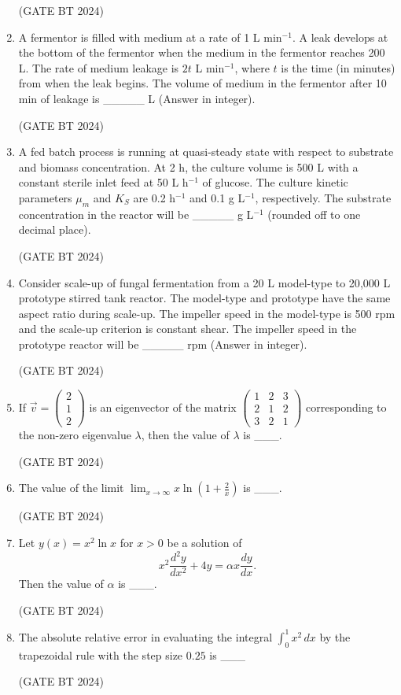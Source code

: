 \documentclass[journal,12pt,onecolumn]{IEEEtran}
\theoremstyle{remark}
\begin{document}
\begin{enumerate}
\hfill (GATE BT 2024)

\item A fermentor is filled with medium at a rate of 1 L min$^{-1}$. A leak develops at the bottom of the fermentor when the medium in the fermentor reaches 200 L. The rate of medium leakage is $2t$ L min$^{-1}$, where $t$ is the time (in minutes) from when the leak begins. The volume of medium in the fermentor after 10 min of leakage is \_\_\_\_\_ L (Answer in integer).

\hfill (GATE BT 2024)

\item A fed batch process is running at quasi-steady state with respect to substrate and biomass concentration. At 2 h, the culture volume is 500 L with a constant sterile inlet feed at 50 L h$^{-1}$ of glucose. The culture kinetic parameters $\mu_m$ and $K_S$ are 0.2 h$^{-1}$ and 0.1 g L$^{-1}$, respectively. The substrate concentration in the reactor will be \_\_\_\_\_ g L$^{-1}$ (rounded off to one decimal place).

\hfill (GATE BT 2024)

\item Consider scale-up of fungal fermentation from a 20 L model-type to 20{,}000 L prototype stirred tank reactor. The model-type and prototype have the same aspect ratio during scale-up. The impeller speed in the model-type is 500 rpm and the scale-up criterion is constant shear. The impeller speed in the prototype reactor will be \_\_\_\_\_ rpm (Answer in integer).

\hfill (GATE BT 2024)

\item If $\vec{v}=\begin{pmatrix}2\\[2pt]1\\[2pt]2\end{pmatrix}$ is an eigenvector of the matrix
$\begin{pmatrix}
1 & 2 & 3\\
2 & 1 & 2\\
3 & 2 & 1
\end{pmatrix}$ corresponding to the non-zero eigenvalue $\lambda$, then the value of $\lambda$ is \_\_\_.

\hfill (GATE BT 2024)

\item The value of the limit $\displaystyle \lim_{x\to\infty} x\ln\!\left(1+\frac{2}{x}\right)$ is \_\_\_.

\hfill (GATE BT 2024)

\item Let $y(x)=x^2\ln x$ for $x>0$ be a solution of
\[
x^2\frac{d^2 y}{dx^2}+4y=\alpha x\frac{dy}{dx}.
\]
Then the value of $\alpha$ is \_\_\_.

\hfill (GATE BT 2024)

\item The absolute relative error in evaluating the integral $\displaystyle \int_{0}^{1} x^2\,dx$ by the trapezoidal rule with the step size $0.25$ is \_\_\_%

\hfill (GATE BT 2024)

\end{enumerate}
\end{document}
